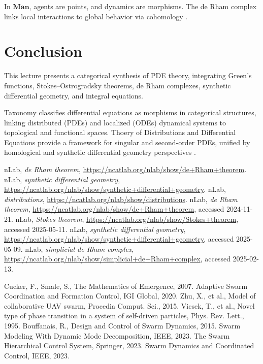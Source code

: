 \documentclass{article}
\theoremstyle{plain}
\newcommand{\cat}[1]{\mathbf{#1}}
\begin{document}
In \(\cat{Man}\), agents are points, and dynamics are morphisms. The de Rham complex links local interactions to global behavior via cohomology \cite{nLab_de_Rham_theorem}.

\section{Conclusion}

This lecture presents a categorical synthesis of PDE theory, integrating Green's functions,
Stokes--Ostrogradsky theorems, de Rham complexes, synthetic differential geometry, and integral equations.

Taxonomy classifies differential equations as morphisms in categorical structures,
linking distributed (PDEs) and localized (ODEs) dynamical systems to topological
and functional spaces. Thoery of Distributions and Differential Equations provide a framework
for singular and second-order PDEs, unified by homological and synthetic differential
geometry perspectives \cite{nLab_synthetic_diff_geom}.

\begin{thebibliography}{9}

 nLab, \emph{de Rham theorem}, \url{https://ncatlab.org/nlab/show/de+Rham+theorem}.
 nLab, \emph{synthetic differential geometry}, \url{https://ncatlab.org/nlab/show/synthetic+differential+geometry}.
 nLab, \emph{distributions}, \url{https://ncatlab.org/nlab/show/distributions}.
 nLab, \emph{de Rham theorem}, \url{https://ncatlab.org/nlab/show/de+Rham+theorem}, accessed 2024-11-21.
 nLab, \emph{Stokes theorem}, \url{https://ncatlab.org/nlab/show/Stokes+theorem}, accessed 2025-05-11.
 nLab, \emph{synthetic differential geometry}, \url{https://ncatlab.org/nlab/show/synthetic+differential+geometry}, accessed 2025-05-09.
 nLab, \emph{simplicial de Rham complex}, \url{https://ncatlab.org/nlab/show/simplicial+de+Rham+complex}, accessed 2025-02-13.

 Cucker, F., Smale, S., The Mathematics of Emergence, 2007.
 Adaptive Swarm Coordination and Formation Control, IGI Global, 2020.
 Zhu, X., et al., Model of collaborative UAV swarm, Procedia Comput. Sci., 2015.
 Vicsek, T., et al., Novel type of phase transition in a system of self-driven particles, Phys. Rev. Lett., 1995.
 Bouffanais, R., Design and Control of Swarm Dynamics, 2015.
 Swarm Modeling With Dynamic Mode Decomposition, IEEE, 2023.
 The Swarm Hierarchical Control System, Springer, 2023.
 Swarm Dynamics and Coordinated Control, IEEE, 2023.

\end{thebibliography}
\end{document}
